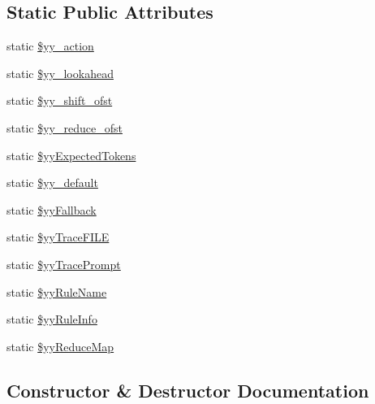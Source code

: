 \subsection*{Static Public Attributes}
\begin{DoxyCompactItemize}
\item 
static \hyperlink{class_smarty___internal___templateparser_ac142a5b913ef2473f8499a30f4f6c1a0}{\$yy\+\_\+action}
\item 
static \hyperlink{class_smarty___internal___templateparser_a3b8f838f9f7e95e02e4f0485fddc50f6}{\$yy\+\_\+lookahead}
\item 
static \hyperlink{class_smarty___internal___templateparser_a2209e68ce0fccc5f4739e063ee42ef0e}{\$yy\+\_\+shift\+\_\+ofst}
\item 
static \hyperlink{class_smarty___internal___templateparser_a3b856b0c76686b62efda7789aae55234}{\$yy\+\_\+reduce\+\_\+ofst}
\item 
static \hyperlink{class_smarty___internal___templateparser_a1fe6200bd9f9078edd70b829fd19d5ee}{\$yy\+Expected\+Tokens}
\item 
static \hyperlink{class_smarty___internal___templateparser_a025f876f20f1828678cf388d553f79d1}{\$yy\+\_\+default}
\item 
static \hyperlink{class_smarty___internal___templateparser_a6b069092d56f15878677704d5febd9c9}{\$yy\+Fallback}
\item 
static \hyperlink{class_smarty___internal___templateparser_a186aaee74f33406312b25b51f86bae04}{\$yy\+Trace\+F\+I\+L\+E}
\item 
static \hyperlink{class_smarty___internal___templateparser_aa4ad5648a401cd049b70f63efcc4b5f3}{\$yy\+Trace\+Prompt}
\item 
static \hyperlink{class_smarty___internal___templateparser_a38c2a9898ce64b9714635acfbfc291d7}{\$yy\+Rule\+Name}
\item 
static \hyperlink{class_smarty___internal___templateparser_a1b2c73431788fbe1e01f52637b23b32d}{\$yy\+Rule\+Info}
\item 
static \hyperlink{class_smarty___internal___templateparser_a17cfef4cb3aee573c01e8df05085eaf9}{\$yy\+Reduce\+Map}
\end{DoxyCompactItemize}


\subsection{Constructor \& Destructor Documentation}
\hypertarget{class_smarty___internal___templateparser_a88f21d9c2bfefae24140906c124699cd}{}
